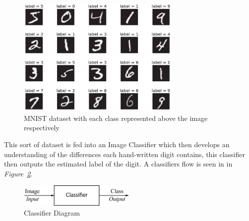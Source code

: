 \documentclass[12pt]{extarticle}
\begin{document}
	\begin{figure}[h]
		\centering
		\includegraphics[width=0.7\textwidth]{pics/Figures/mnist.png}
		\caption{\small{MNIST dataset with each class represented above the image respectively}}
		\label{fig:MNIST_img}
	\end{figure}
	This sort of dataset is fed into an Image Classifier which then develops an understanding of the differences each hand-written digit contains, this classifier then outputs the estimated label of the digit. A classifiers flow is seen in in \emph{Figure~\ref{fig:Classifier}}.
	\begin{figure}[h]
		\centering
		\includegraphics[width=0.5\textwidth]{pics/Figures/Classifier_Block_Diagram.eps}
		\caption{\small{Classifier Diagram}}
		\label{fig:Classifier}
	\end{figure}
\end{document}
